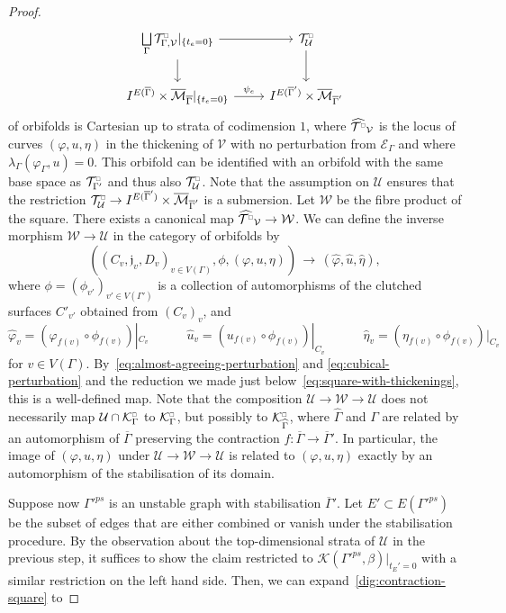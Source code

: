 \documentclass[11pt,psamsfonts, oneside, reqno]{amsart}
\newcommand{\sub}{\subset}%
\newcommand{\g}{\circ}%
\newcommand{\cl}{\colon}
\newcommand{\djun}[1]{\bigsqcup\limits_{#1}}
\newcommand{\Mbar}{\overline{\mathcal M}}
\newcommand{\cE}{\mathcal{E}}
\newcommand{\cK}{\mathcal{K}}
\newcommand{\cT}{\mathcal{T}}
\newcommand{\cU}{\mathcal{U}}
\newcommand{\cV}{\mathcal{V}}
\newcommand{\cW}{\mathcal{W}}
\newcommand{\fj}{\mathfrak{j}}
\newcommand{\wh}{\widehat}
\newcommand{\ov}[1]{\overline{#1}}
\newcommand{\cKc}{\cK^{\scale{\square}{0.6}}}
\newcommand{\scale}[2]{\scaleobj{#2}{#1}}
\newcommand{\cTc}{\cT^{\scale{\square}{0.6}}}
\theoremstyle{definition}
\theoremstyle{remark}
\numberwithin{equation}{section}
\begin{document}
\begin{proof}
\begin{equation}
\begin{tikzcd}
			\djun{\Gamma}\cTc_{\Gamma,\cV}|_{\{t_e = 0\}} \arrow[r,""] \arrow[d,""]&\cTc_\cU \arrow[d,""]\\ 
			I^{E(\ov\Gamma)}\times\Mbar_{\ov\Gamma}|_{\{t_e = 0\}}\arrow[r,"\psi_e"] & I^{E(\ov\Gamma')}\times\Mbar_{\ov\Gamma'} \end{tikzcd}		
	\end{equation}
	of orbifolds is Cartesian up to strata of codimension $1$, where $\wh{\cTc}_{\cV}$ is the locus of curves $(\varphi,u,\eta)$ in the thickening of $\cV$ with no perturbation from $\cE_\Gamma$ and where $\lambda_\Gamma(\varphi_{\Gamma},u) = 0$. This orbifold can be identified with an orbifold with the same base space as $\cTc_{\Gamma'}$ and thus also $\cTc_\cU$. Note that the assumption on $\cU$ ensures that the restriction $\cTc_{\cU}\to I^{E(\ov\Gamma')}\times\Mbar_{\ov\Gamma'}$ is a submersion. Let $\cW$ be the fibre product of the square. There exists a canonical map $\wh{\cTc}_\cV\to \cW$. We can define the inverse morphism $\cW\to \cU$ in the category of orbifolds by 
	\[((C_{v},\fj_v,D_v)_{v\in V(\Gamma)},\phi,(\varphi,u,\eta))\,\to\,(\wh\varphi,\wh u,\wh \eta),\]
	where $\phi =(\phi_{v'})_{v'\in V(\Gamma')}$ is a collection of automorphisms of the clutched surfaces $C'_{v'}$ obtained from $(C_v)_v$, and  
	\[\wh\varphi_{v} = (\varphi_{f(v)}\g \phi_{f(v)})|_{C_v}\qquad \quad\wh{u}_v = (u_{f(v)}\g \phi_{f(v)})|_{C_v}\qquad \quad\wh\eta_v = (\eta_{f(v)}\g \phi_{f(v)})|_{C_v}\]
	for $v \in V(\Gamma)$. By~\eqref{eq:almost-agreeing-perturbation} and \eqref{eq:cubical-perturbation} and the reduction we made just below~\eqref{eq:square-with-thickenings}, this is a well-defined map. Note that the composition $\cU\to \cW\to \cU$ does not necessarily map $\cU\cap \cKc_\Gamma$ to $\cKc_\Gamma$, but possibly to $\cKc_{\wh\Gamma}$, where $\wh\Gamma$ and $\Gamma$ are related by an automorphism of $\ov\Gamma$ preserving the contraction $f \cl \ov\Gamma\to \ov\Gamma'$. In particular, the image of $(\varphi,u,\eta)$ under $\cU \to \cW\to \cU$ is related to $(\varphi,u,\eta)$ exactly by an automorphism of the stabilisation of its domain.\par 
	Suppose now ${\Gamma'}^{ps}$ is an unstable graph with stabilisation $\ov\Gamma'$. Let $E' \sub E({\Gamma'}^{ps})$ be the subset of edges that are either combined or vanish under the stabilisation procedure. By the observation about the top-dimensional strata of $\cU$ in the previous step, it suffices to show the claim restricted to $\cK({\Gamma'}^{ps},\beta)|_{{t_E' = 0}}$ with a similar restriction on the left hand side. Then, we can  expand~\eqref{dig:contraction-square} to 

\end{proof}
\end{document}
